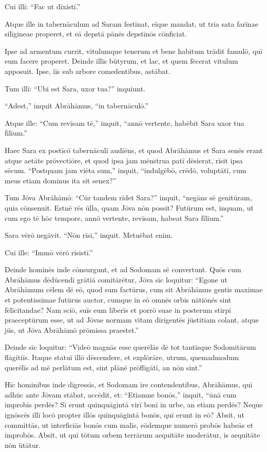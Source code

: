 Cui illī: ``Fac ut dīxistī.''

\Versus Atque ille in tabernāculum ad Saram festīnat, eīque mandat, ut tria sata farīnae silīgineae properet, et eā depstā pānēs depstīnōs cōnficiat.

\Versus Ipse ad armentum currit, vitulumque tenerum et bene habitum trādit famulō, quī eum facere properet.
\Versus Deinde illīs būtyrum, et lac, et quem fēcerat vitulum apposuit. Ipse, iīs sub arbore comedentibus, astābat.

\Versus Tum illī: ``Ubi est Sara, uxor tua?'' inquiunt.

``Adest,'' inquit Abrāhāmus, ``in tabernāculō.''

\Versus Atque ille: ``Cum revīsam tē,'' inquit, ``annō vertente, habēbit Sara uxor tua fīlium.''

Haec Sara ex postīcō tabernāculī audiēns,
\Versus et quod Abrāhāmus et Sara senēs erant atque aetāte prōvectiōre, et quod ipsa jam mēnstrua patī dēsierat,
\Versus rīsit ipsa sēcum. ``Postquam jam viēta sum,'' inquit, ``indulgēbō, crēdō, voluptātī, cum meus etiam dominus ita sit senex?''

\Versus Tum Jōva Abrāhāmō: ``Cūr tandem rīdet Sara?'' inquit, ``negāns sē genitūram, quia cōnsenuit.
\Versus Estnē rēs ūlla, quam Jōva nōn possit? Futūrum est, inquam, ut cum ego tē hōc tempore, annō vertente, revīsam, habeat Sara fīlium.''

\Versus Sara vērō negāvit. ``Nōn rīsī,'' inquit. Metuēbat enim.

Cui ille: ``Immō vērō rīsistī.''

\Versus Deinde hominēs inde cōnsurgunt, et ad Sodomam sē convertunt. Quōs cum Abrāhāmus dēdūcendī grātiā comitārētur,
\Versus Jōva sīc loquitur: ``Egone ut Abrāhāmum cēlem dē eō, quod sum factūrus,
\Versus cum sit Abrāhāmus gentis maximae et potentissimae futūrus auctor, cumque in eō omnēs orbis nātiōnēs sint fēlīcitandae?
\Versus Nam sciō, suīs eum līberīs et porrō suae in posterum stirpī praeceptūrum esse, ut ad Jōvae normam vītam dīrigentēs jūstitiam colant, atque jūs, ut Jōva Abrāhāmō prōmissa praestet.''

\Versus Deinde sīc loquitur: ``Videō magnās esse querēlās dē tot tantīsque Sodomitārum flāgitiīs.
\Versus Itaque statuī illō dēscendere, et explōrāre, utrum, quemadmodum querēlīs ad mē perlātum est, sint plānē prōflīgātī, an nōn sint.''

\Versus Hīc hominibus inde dīgressīs, et Sodomam īre contendentibus, Abrāhāmus, quī adhūc ante Jōvam stābat,
\Versus accēdit, et: ``Etiamne bonōs,'' inquit, ``ūnā cum improbīs perdēs?
\Versus Sī erunt quīnquāgintā virī bonī in urbe, an etiam perdēs? Neque ignōscēs illī locō propter illōs quīnquāgintā bonōs, quī erunt in eō?
\Versus Absit, ut committās, ut interficiās bonōs cum malīs, eōdemque numerō probōs habeās et improbōs. Absit, ut quī tōtum orbem terrārum aequitāte moderātur, is aequitāte nōn ūtātur.

